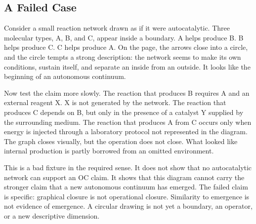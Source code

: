 \documentclass[11pt,a4paper,openany]{book}
\begin{document}
\subsection{A Failed Case}
Consider a small reaction network drawn as if it were autocatalytic. Three molecular types, A, B, and C, appear inside a boundary. A helps produce B. B helps produce C. C helps produce A. On the page, the arrows close into a circle, and the circle tempts a strong description: the network seems to make its own conditions, sustain itself, and separate an inside from an outside. It looks like the beginning of an autonomous continuum. \cite{haken_synergetics,nicolis_prigogine_selforg}\par
Now test the claim more slowly. The reaction that produces B requires A and an external reagent X. X is not generated by the network. The reaction that produces C depends on B, but only in the presence of a catalyst Y supplied by the surrounding medium. The reaction that produces A from C occurs only when energy is injected through a laboratory protocol not represented in the diagram. The graph closes visually, but the operation does not close. What looked like internal production is partly borrowed from an omitted environment.\par
This is a bad fixture in the required sense. It does not show that no autocatalytic network can support an OC claim. It shows that this diagram cannot carry the stronger claim that a new autonomous continuum has emerged. The failed claim is specific: graphical closure is not operational closure. Similarity to emergence is not evidence of emergence. A circular drawing is not yet a boundary, an operator, or a new descriptive dimension.\par
\end{document}
